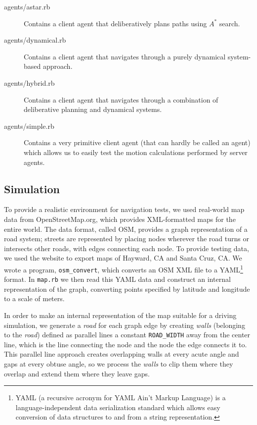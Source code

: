 \documentclass{article}
\newcommand{\code}{\texttt}
\begin{document}
\begin{description}
\item[agents/astar.rb] Contains a client agent that deliberatively
  plans paths using $A^*$ search.

\item[agents/dynamical.rb] Contains a client agent that navigates
  through a purely dynamical system-based approach.

\item[agents/hybrid.rb] Contains a client agent that navigates through
  a combination of deliberative planning and dynamical systems.

\item[agents/simple.rb] Contains a very primitive client agent (that
  can hardly be called an agent) which allows us to easily test the
  motion calculations performed by server agents.

\end{description}

\subsection{Simulation}
To provide a realistic environment for navigation tests, we used real-world map
data from OpenStreetMap.org, which provides XML-formatted maps for the entire
world. The data format, called OSM, provides a graph representation of a road
system; streets are represented by placing nodes wherever the road turns or
intersects other roads, with edges connecting each node. To provide testing
data, we used the website to export maps of Hayward, CA and Santa Cruz, CA. We
wrote a program, \code{osm\_convert}, which converts an OSM XML file to a
YAML\footnote{YAML (a recursive acronym for YAML Ain't Markup Language) is a
  language-independent data serialization standard which allows easy conversion
  of data structures to and from a string representation.} format. In
\code{map.rb} we then read this YAML data and construct an internal
representation of the graph, converting points specified by latitude and
longitude to a scale of meters.

In order to make an internal representation of the map suitable for a driving
simulation, we generate a \emph{road} for each graph edge by creating
\emph{walls} (belonging to the \emph{road}) defined as parallel lines a constant
\code{ROAD\_WIDTH} away from the center line, which is the line connecting the
node and the node the edge connects it to. This parallel line approach creates
overlapping walls at every acute angle and gaps at every obtuse angle, so we
process the \emph{walls} to clip them where they overlap and extend them where
they leave gaps.
\end{document}
